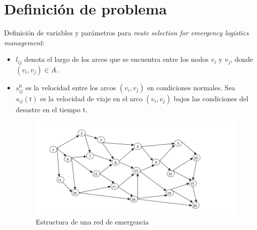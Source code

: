 \section{Definición de problema}

Definición de variables y parámetros para \textit{route selection for emergency logistics management}:
\begin{itemize}
		\item $l_{ij}$ denota el largo de los arcos que se encuentra entre los nodos $v_i$ y $v_j$, donde $(v_i,v_j) \in A$.
	\item $s_{ij}^0$ es la velocidad entre los arcos $(v_i,v_j)$ en condiciones normales. Sea $s_{ij}(t)$ es la velocidad de viaje en el arco $(v_i,v_j)$ bajos las condiciones del desastre en el tiempo t.\\

\begin{figure}[h]
\centering
\includegraphics[scale=0.5]{images/routes.png}
\caption{Estructura de una red de emergencia}
\end{figure}
	

\end{itemize}
